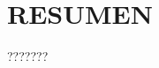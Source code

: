 \clearpage
{} 
    \setcounter{page}{2}
\thispagestyle{plain}
\section*{\centering RESUMEN}
\justify %
???????
\clearpage
    